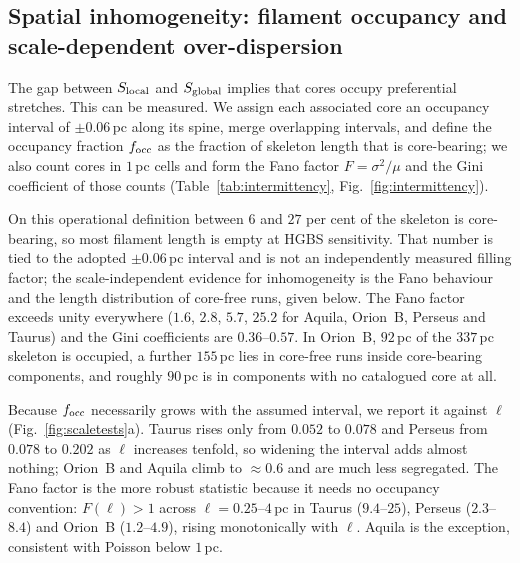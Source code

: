 \documentclass[usenatbib,twoside,twocolumn]{mnras}
\begin{document}
\subsection{Spatial inhomogeneity: filament occupancy and scale-dependent over-dispersion}
\label{sec:intermittency}

The gap between $S_{\rm local}$ and $S_{\rm global}$ implies that cores occupy preferential stretches. This can be measured. We assign each associated core an occupancy interval of $\pm0.06$\,pc along its spine, merge overlapping intervals, and define the occupancy fraction $f_{\rm occ}$ as the fraction of skeleton length that is core-bearing; we also count cores in $1$\,pc cells and form the Fano factor $F=\sigma^2/\mu$ and the Gini coefficient of those counts (Table~\ref{tab:intermittency}, Fig.~\ref{fig:intermittency}).

On this operational definition between $6$ and $27$ per cent of the skeleton is core-bearing, so most filament length is empty at HGBS sensitivity. That number is tied to the adopted $\pm0.06$\,pc interval and is not an independently measured filling factor; the scale-independent evidence for inhomogeneity is the Fano behaviour and the length distribution of core-free runs, given below. The Fano factor exceeds unity everywhere ($1.6$, $2.8$, $5.7$, $25.2$ for Aquila, Orion~B, Perseus and Taurus) and the Gini coefficients are $0.36$--$0.57$. In Orion~B, $92$\,pc of the $337$\,pc skeleton is occupied, a further $155$\,pc lies in core-free runs inside core-bearing components, and roughly $90$\,pc is in components with no catalogued core at all.

Because $f_{\rm occ}$ necessarily grows with the assumed interval, we report it against $\ell$ (Fig.~\ref{fig:scaletests}a). Taurus rises only from $0.052$ to $0.078$ and Perseus from $0.078$ to $0.202$ as $\ell$ increases tenfold, so widening the interval adds almost nothing; Orion~B and Aquila climb to $\approx0.6$ and are much less segregated. The Fano factor is the more robust statistic because it needs no occupancy convention: $F(\ell)>1$ across $\ell=0.25$--$4$\,pc in Taurus ($9.4$--$25$), Perseus ($2.3$--$8.4$) and Orion~B ($1.2$--$4.9$), rising monotonically with $\ell$. Aquila is the exception, consistent with Poisson below $1$\,pc.
\end{document}
